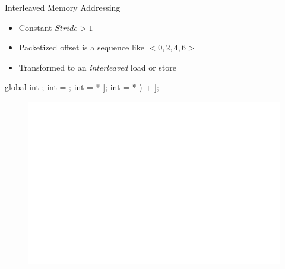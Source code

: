 
\begin{frame}[fragile]{Interleaved Memory Addressing}

\begin{itemize}
    \item Constant $Stride > 1$
    \item Packetized offset is a sequence like $<0, 2, 4, 6>$
    \item Transformed to an \emph{interleaved} load or store
\end{itemize}

\begin{minipage}[t]{0.40\linewidth}
    \vspace{0.1ex}
    \begin{codebox}[commandchars=\\\[\]]
    
global int \uniform[*src];
int \varying[tid] = ;
int \varying[even] = \uniform[src]\idx[\varying[tid] * \uniform[2]];
int \varying[odd] = \uniform[src]\idx[(\varying[tid] * \uniform[2]) + \uniform[1]];




    \end{codebox}
\end{minipage}
\hspace{1em}
\begin{minipage}[t]{0.49\linewidth}
    \begin{figure}
        \includegraphics[scale=0.5]{images/interleaved-access.pdf}
    \end{figure}
\end{minipage}

\end{frame}

